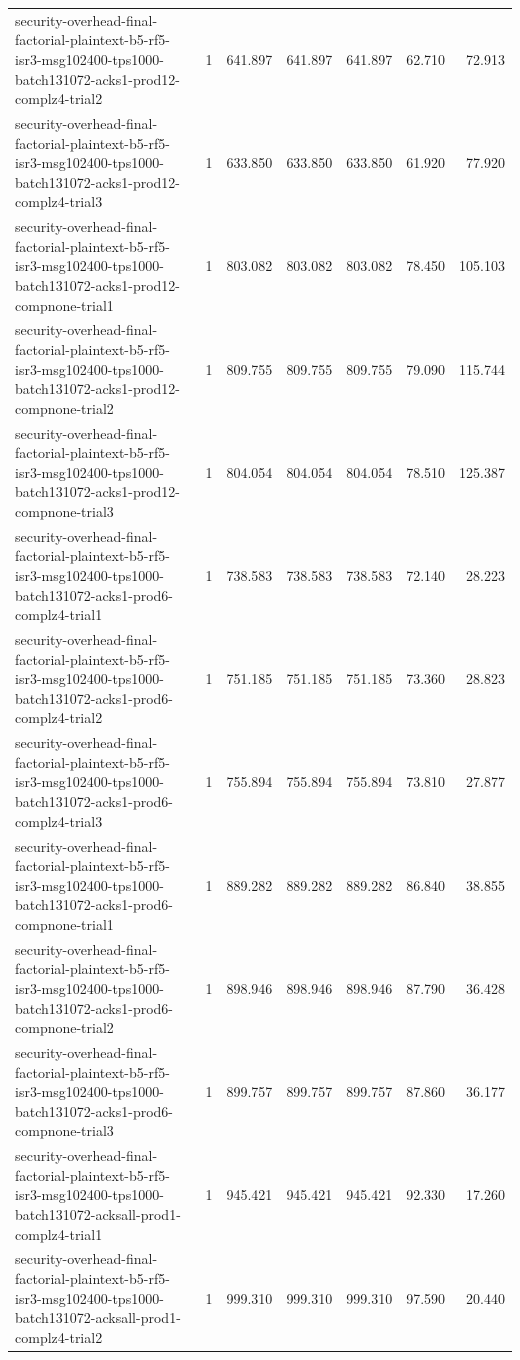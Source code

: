 \begin{tabular}{lrrrrrr}
security-overhead-final-factorial-plaintext-b5-rf5-isr3-msg102400-tps1000-batch131072-acks1-prod12-complz4-trial2 & 1 & 641.897 & 641.897 & 641.897 & 62.710 & 72.913 \\
security-overhead-final-factorial-plaintext-b5-rf5-isr3-msg102400-tps1000-batch131072-acks1-prod12-complz4-trial3 & 1 & 633.850 & 633.850 & 633.850 & 61.920 & 77.920 \\
security-overhead-final-factorial-plaintext-b5-rf5-isr3-msg102400-tps1000-batch131072-acks1-prod12-compnone-trial1 & 1 & 803.082 & 803.082 & 803.082 & 78.450 & 105.103 \\
security-overhead-final-factorial-plaintext-b5-rf5-isr3-msg102400-tps1000-batch131072-acks1-prod12-compnone-trial2 & 1 & 809.755 & 809.755 & 809.755 & 79.090 & 115.744 \\
security-overhead-final-factorial-plaintext-b5-rf5-isr3-msg102400-tps1000-batch131072-acks1-prod12-compnone-trial3 & 1 & 804.054 & 804.054 & 804.054 & 78.510 & 125.387 \\
security-overhead-final-factorial-plaintext-b5-rf5-isr3-msg102400-tps1000-batch131072-acks1-prod6-complz4-trial1 & 1 & 738.583 & 738.583 & 738.583 & 72.140 & 28.223 \\
security-overhead-final-factorial-plaintext-b5-rf5-isr3-msg102400-tps1000-batch131072-acks1-prod6-complz4-trial2 & 1 & 751.185 & 751.185 & 751.185 & 73.360 & 28.823 \\
security-overhead-final-factorial-plaintext-b5-rf5-isr3-msg102400-tps1000-batch131072-acks1-prod6-complz4-trial3 & 1 & 755.894 & 755.894 & 755.894 & 73.810 & 27.877 \\
security-overhead-final-factorial-plaintext-b5-rf5-isr3-msg102400-tps1000-batch131072-acks1-prod6-compnone-trial1 & 1 & 889.282 & 889.282 & 889.282 & 86.840 & 38.855 \\
security-overhead-final-factorial-plaintext-b5-rf5-isr3-msg102400-tps1000-batch131072-acks1-prod6-compnone-trial2 & 1 & 898.946 & 898.946 & 898.946 & 87.790 & 36.428 \\
security-overhead-final-factorial-plaintext-b5-rf5-isr3-msg102400-tps1000-batch131072-acks1-prod6-compnone-trial3 & 1 & 899.757 & 899.757 & 899.757 & 87.860 & 36.177 \\
security-overhead-final-factorial-plaintext-b5-rf5-isr3-msg102400-tps1000-batch131072-acksall-prod1-complz4-trial1 & 1 & 945.421 & 945.421 & 945.421 & 92.330 & 17.260 \\
security-overhead-final-factorial-plaintext-b5-rf5-isr3-msg102400-tps1000-batch131072-acksall-prod1-complz4-trial2 & 1 & 999.310 & 999.310 & 999.310 & 97.590 & 20.440 \\

\end{tabular}
